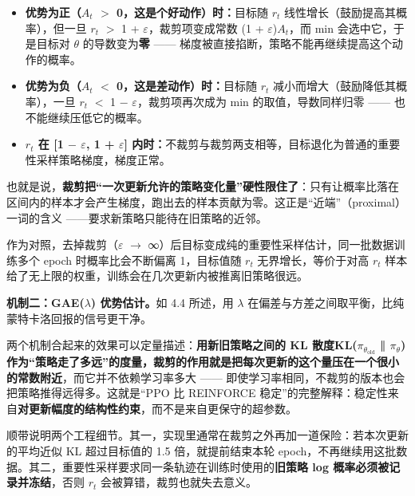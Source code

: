 \documentclass[11pt,a4paper]{ctexart}
\begin{document}
\begin{itemize}[leftmargin=1.6em,itemsep=0.15em,topsep=0.25em]

\item \textbf{优势为正（$A_{t}$ $>$ 0，这是个好动作）时：}目标随 $r_{t}$ 线性增长（鼓励提高其概率），但一旦 $r_{t}$ $>$ 1 + $\varepsilon$，裁剪项变成常数 (1 + $\varepsilon$)$A_{t}$，而 min 会选中它，于是目标对 $\theta$ 的导数变为\textbf{零} —— 梯度被直接掐断，策略不能再继续提高这个动作的概率。

\item \textbf{优势为负（$A_{t}$ $<$ 0，这是差动作）时：}目标随 $r_{t}$ 减小而增大（鼓励降低其概率），一旦 $r_{t}$ $<$ 1 $-$ $\varepsilon$，裁剪项再次成为 min 的取值，导数同样归零 —— 也不能继续压低它的概率。

\item \textbf{$r_{t}$ 在 [1 $-$ $\varepsilon$, 1 + $\varepsilon$] 内时：}不裁剪与裁剪两支相等，目标退化为普通的重要性采样策略梯度，梯度正常。

\end{itemize}

也就是说，\textbf{裁剪把“一次更新允许的策略变化量”硬性限住了}：只有让概率比落在区间内的样本才会产生梯度，跑出去的样本贡献为零。这正是“近端”（proximal）一词的含义 ——要求新策略只能待在旧策略的近邻。\par

作为对照，去掉裁剪（$\varepsilon$ $\rightarrow$ ∞）后目标变成纯的重要性采样估计，同一批数据训练多个 epoch 时概率比会不断偏离 1，目标值随 $r_{t}$ 无界增长，等价于对高 $r_{t}$ 样本给了无上限的权重，训练会在几次更新内被推离旧策略很远。\par

\textbf{机制二：GAE($\lambda$) 优势估计。}如 4.4 所述，用 $\lambda$ 在偏差与方差之间取平衡，比纯蒙特卡洛回报的信号更干净。\par

两个机制合起来的效果可以定量描述：\textbf{用新旧策略之间的 KL 散度KL($\pi_{\theta_{\mathrm{old}}}$ ‖ $\pi_{\theta}$) 作为“策略走了多远”的度量，裁剪的作用就是把每次更新的这个量压在一个很小的常数附近}，而它并不依赖学习率多大 —— 即使学习率相同，不裁剪的版本也会把策略推得远得多。这就是“PPO 比 REINFORCE 稳定”的完整解释：稳定性来自\textbf{对更新幅度的结构性约束}，而不是来自更保守的超参数。\par

顺带说明两个工程细节。其一，实现里通常在裁剪之外再加一道保险：若本次更新的平均近似 KL 超过目标值的 1.5 倍，就提前结束本轮 epoch，不再继续用这批数据。其二，重要性采样要求同一条轨迹在训练时使用的\textbf{旧策略 log 概率必须被记录并冻结}，否则 $r_{t}$ 会被算错，裁剪也就失去意义。\par
\end{document}
